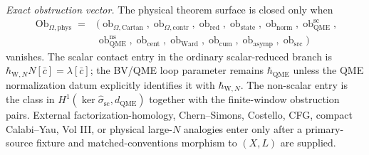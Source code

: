 \begin{stmt}
  \emph{Exact obstruction vector.} The physical theorem surface is
  closed only when
  \[
  \begin{aligned}
    \operatorname{Ob}_{\Omega,\mathrm{phys}}
    ={}&
    (
      \operatorname{ob}_{\Omega,\mathrm{Cartan}},
      \operatorname{ob}_{\Omega,\mathrm{contr}},
      \operatorname{ob}_{\mathrm{red}},
      \operatorname{ob}_{\mathrm{state}},
      \operatorname{ob}_{\mathrm{norm}},
      \operatorname{ob}^{\mathrm{sc}}_{\mathrm{QME}},
      \\
      &
      \operatorname{ob}^{\mathrm{ns}}_{\mathrm{QME}},
      \operatorname{ob}_{\mathrm{cent}},
      \operatorname{ob}_{\mathrm{Ward}},
      \operatorname{ob}_{\mathrm{cum}},
      \operatorname{ob}_{\mathrm{asymp}},
      \operatorname{ob}_{\mathrm{src}}
    )
  \end{aligned}
  \]
  vanishes.  The scalar contact entry in the ordinary scalar-reduced
  branch is
  \(\hbar_{\mathrm{W},N}N[\bar c]=\lambda[\bar c]\); the BV/QME loop
  parameter remains \(\hbar_{\mathrm{QME}}\) unless the QME
  normalization datum explicitly identifies it with
  \(\hbar_{\mathrm{W},N}\).  The non-scalar entry is the
  class in
  \(H^1(\ker\widehat\sigma_{\mathrm{sc}},d_{\mathrm{QME}})\) together
  with the finite-window obstruction pairs.  External
  factorization-homology, Chern--Simons, Costello, CFG, compact
  Calabi--Yau, Vol III, or physical large-\(N\) analogies enter only
  after a primary-source fixture and matched-conventions morphism to
  \((X,L)\) are supplied.
\end{stmt}

